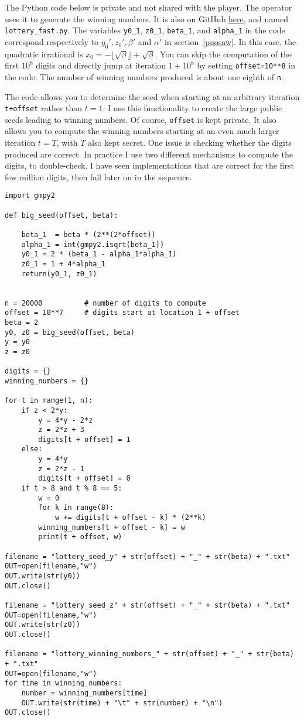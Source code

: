 \documentclass[oneside,10pt]{book}
\begin{document}
The Python code below is private and not shared with the player. The operator uses it to generate the winning numbers. It is also on GitHub \href{https://github.com/VincentGranville/Stochastic-Processes/blob/master/lottery_fast.py}{here},
 and named \texttt{lottery\_fast.py}. The variables \texttt{y0\_1}, \texttt{z0\_1}, \texttt{beta\_1}, and
\texttt{alpha\_1} in the code correspond respectively to $y_0', z_0', \beta'$ and $\alpha'$  in section~\ref{puosaw}.
In this case, the quadratic irrational is $x_0 = -\lfloor\sqrt{\beta}\rfloor  + \sqrt{\beta}$. You can skip
 the computation of the first $10^8$ digits and directly jump at iteration $1+ 10^8$ by
 setting \texttt{offset=10**8} in the code. The number of winning numbers produced is
about one eighth of \texttt{n}.

The code allows you to determine the seed when starting at an arbitrary iteration \texttt{t+offset} rather
 than $t=1$. I use this functionality to create the large public seeds leading to winning numbers. Of course, \texttt{offset} is kept private. It also allows you to compute the winning numbers starting at an even much larger iteration $t=T$, with $T$ also kept secret.
One issue is checking whether the digits produced are correct. In practice I use two different mechanisms to compute the digits, to double-check. I have seen implementations that are correct for the first few million digits, then fail later on in the sequence. \vspace{1ex}

 \begin{lstlisting}
import gmpy2

def big_seed(offset, beta):

    beta_1  = beta * (2**(2*offset))
    alpha_1 = int(gmpy2.isqrt(beta_1))
    y0_1 = 2 * (beta_1 - alpha_1*alpha_1)
    z0_1 = 1 + 4*alpha_1
    return(y0_1, z0_1)


n = 20000          # number of digits to compute
offset = 10**7     # digits start at location 1 + offset
beta = 2
y0, z0 = big_seed(offset, beta)
y = y0
z = z0

digits = {}
winning_numbers = {}

for t in range(1, n):
    if z < 2*y:
        y = 4*y - 2*z
        z = 2*z + 3
        digits[t + offset] = 1
    else:
        y = 4*y
        z = 2*z - 1
        digits[t + offset] = 0
    if t > 8 and t % 8 == 5:
        w = 0
        for k in range(8):
            w += digits[t + offset - k] * (2**k)
        winning_numbers[t + offset - k] = w
        print(t + offset, w)

filename = "lottery_seed_y" + str(offset) + "_" + str(beta) + ".txt"
OUT=open(filename,"w")
OUT.write(str(y0))
OUT.close()

filename = "lottery_seed_z" + str(offset) + "_" + str(beta) + ".txt"
OUT=open(filename,"w")
OUT.write(str(z0))
OUT.close()

filename = "lottery_winning_numbers_" + str(offset) + "_" + str(beta) + ".txt"
OUT=open(filename,"w")
for time in winning_numbers:
    number = winning_numbers[time]
    OUT.write(str(time) + "\t" + str(number) + "\n")
OUT.close()
\end{lstlisting}
\end{document}
